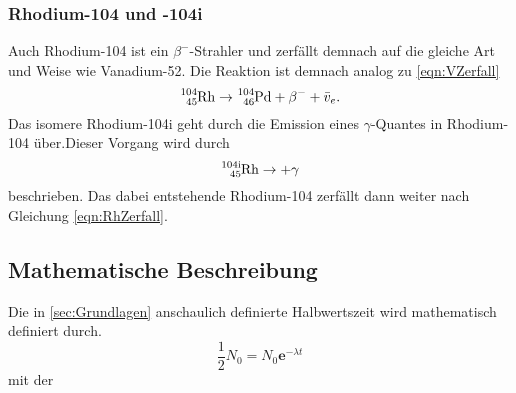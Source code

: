 \subsubsection*{Rhodium-104 und -104i}
Auch Rhodium-104 ist ein $\beta^-$-Strahler und zerfällt demnach auf die gleiche Art und Weise wie 
Vanadium-52. Die Reaktion ist demnach analog zu \ref{eqn:VZerfall}
\begin{equation}
    \ce{^{104}_{45}Rh}\rightarrow\ce{^{104}_{46}Pd}+\beta^-+\bar{v}_e. \label{eqn:RhZerfall}
\end{equation}
Das isomere Rhodium-104i geht durch die Emission eines $\gamma$-Quantes in Rhodium-104 über.Dieser 
Vorgang wird durch
\begin{equation}
    \ce{^{104 i}_{45}Rh}\rightarrow+\gamma
\end{equation}
beschrieben. Das dabei entstehende Rhodium-104 zerfällt dann weiter nach Gleichung \ref{eqn:RhZerfall}.
\subsection{Mathematische Beschreibung}
\label{sec:mathe}
Die in \ref{sec:Grundlagen} anschaulich definierte Halbwertszeit wird mathematisch definiert durch.
\begin{equation}
    \frac{1}{2}N_0=N_0\textbf{e}^{-\lambda t}
\end{equation}
mit der 